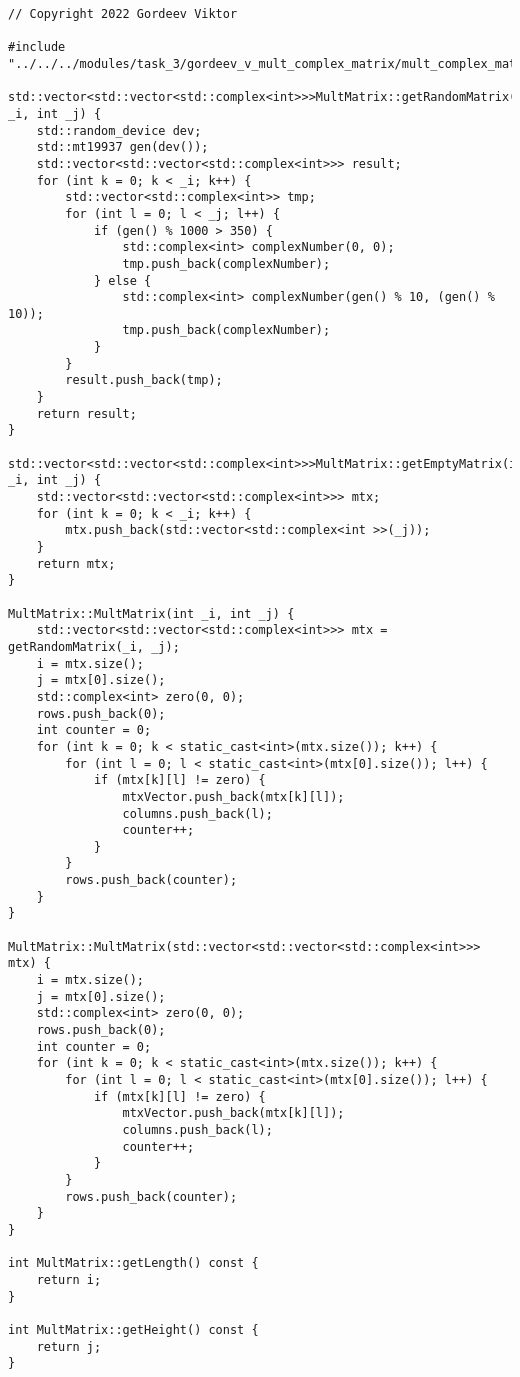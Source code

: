 \documentclass{report}
\begin{document}
\begin{lstlisting}
// Copyright 2022 Gordeev Viktor

#include "../../../modules/task_3/gordeev_v_mult_complex_matrix/mult_complex_matrix.h"

std::vector<std::vector<std::complex<int>>>MultMatrix::getRandomMatrix(int _i, int _j) {
    std::random_device dev;
    std::mt19937 gen(dev());
    std::vector<std::vector<std::complex<int>>> result;
    for (int k = 0; k < _i; k++) {
        std::vector<std::complex<int>> tmp;
        for (int l = 0; l < _j; l++) {
            if (gen() % 1000 > 350) {
                std::complex<int> complexNumber(0, 0);
                tmp.push_back(complexNumber);
            } else {
                std::complex<int> complexNumber(gen() % 10, (gen() % 10));
                tmp.push_back(complexNumber);
            }
        }
        result.push_back(tmp);
    }
    return result;
}

std::vector<std::vector<std::complex<int>>>MultMatrix::getEmptyMatrix(int _i, int _j) {
    std::vector<std::vector<std::complex<int>>> mtx;
    for (int k = 0; k < _i; k++) {
        mtx.push_back(std::vector<std::complex<int >>(_j));
    }
    return mtx;
}

MultMatrix::MultMatrix(int _i, int _j) {
    std::vector<std::vector<std::complex<int>>> mtx = getRandomMatrix(_i, _j);
    i = mtx.size();
    j = mtx[0].size();
    std::complex<int> zero(0, 0);
    rows.push_back(0);
    int counter = 0;
    for (int k = 0; k < static_cast<int>(mtx.size()); k++) {
        for (int l = 0; l < static_cast<int>(mtx[0].size()); l++) {
            if (mtx[k][l] != zero) {
                mtxVector.push_back(mtx[k][l]);
                columns.push_back(l);
                counter++;
            }
        }
        rows.push_back(counter);
    }
}

MultMatrix::MultMatrix(std::vector<std::vector<std::complex<int>>> mtx) {
    i = mtx.size();
    j = mtx[0].size();
    std::complex<int> zero(0, 0);
    rows.push_back(0);
    int counter = 0;
    for (int k = 0; k < static_cast<int>(mtx.size()); k++) {
        for (int l = 0; l < static_cast<int>(mtx[0].size()); l++) {
            if (mtx[k][l] != zero) {
                mtxVector.push_back(mtx[k][l]);
                columns.push_back(l);
                counter++;
            }
        }
        rows.push_back(counter);
    }
}

int MultMatrix::getLength() const {
    return i;
}

int MultMatrix::getHeight() const {
    return j;
}


\end{lstlisting}
\end{document}
